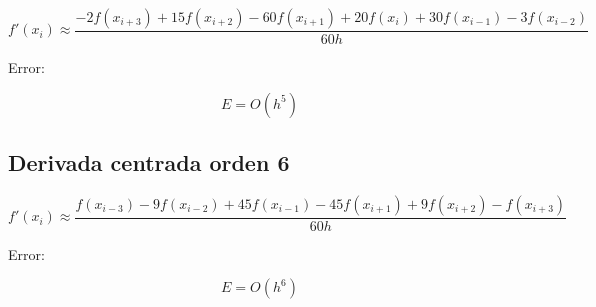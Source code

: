 \documentclass[12pt]{article}
\begin{document}
\[
f'(x_i) \approx
\frac{-2f(x_{i+3}) + 15f(x_{i+2}) - 60f(x_{i+1}) + 20f(x_i) + 30f(x_{i-1}) - 3f(x_{i-2})}{60h}
\]

Error:

\[
E = O(h^5)
\]


\subsection*{Derivada centrada orden 6}

\[
f'(x_i) \approx
\frac{f(x_{i-3}) - 9f(x_{i-2}) + 45f(x_{i-1}) - 45f(x_{i+1}) + 9f(x_{i+2}) - f(x_{i+3})}{60h}
\]

Error:

\[
E = O(h^6)
\]
\end{document}
